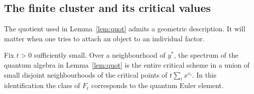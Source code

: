 \subsection{The finite cluster and its critical values}
The quotient used in Lemma~\ref{lem:quot} admits a geometric description. It will matter when one tries to attach an object to an individual factor.

\begin{proposition}\label{prop:cluster}
Fix $t>0$ sufficiently small. Over a neighbourhood of $y^*$, the spectrum of the quantum algebra in Lemma~\ref{lem:quot} is the entire critical scheme in a union of small disjoint neighbourhoods of the critical points of $t\sum_i x^{v_i}$. In this identification the class of $F_t$ corresponds to the quantum Euler element.
\end{proposition}
